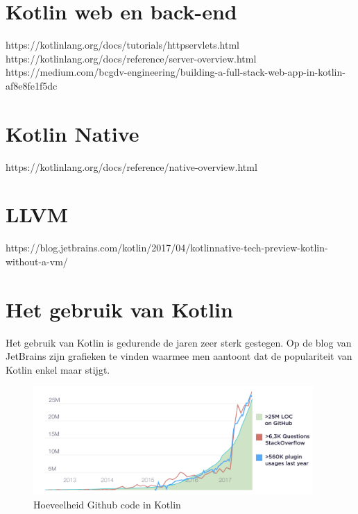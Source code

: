 \section{Kotlin web en back-end}
\label{sec:kotlincrossplatform}
https://kotlinlang.org/docs/tutorials/httpservlets.html
https://kotlinlang.org/docs/reference/server-overview.html
https://medium.com/bcgdv-engineering/building-a-full-stack-web-app-in-kotlin-af8e8fe1f5dc

\section{Kotlin Native}
\label{sec:kotlinnative}
https://kotlinlang.org/docs/reference/native-overview.html

\section{LLVM}
\label{sec:llvm}
https://blog.jetbrains.com/kotlin/2017/04/kotlinnative-tech-preview-kotlin-without-a-vm/

\section{Het gebruik van Kotlin}
\label{sec:kotlingebruik}
Het gebruik van Kotlin is gedurende de jaren zeer sterk gestegen. Op de blog van JetBrains zijn grafieken te vinden waarmee men aantoont dat de populariteit van Kotlin enkel maar stijgt.

\begin{figure} [ht]
	\centering
	\includegraphics[width=0.95\textwidth]{img/KotlinAdoption.png}
	\caption{Hoeveelheid Github code in Kotlin \cite{JetBrains12}}
	\label{fig:kotlingithub}
\end{figure}

